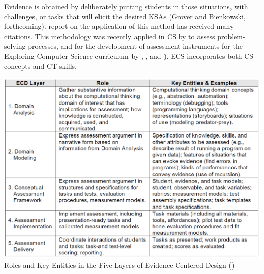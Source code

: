 Evidence is obtained by deliberately putting students in those situations, with challenges, or tasks that will elicit the desired KSAs (Grover and Bienkowski, forthcoming).  report on the application of this method has received many citations. This methodology was recently applied in CS by  to assess problem-solving processes, and for the development of assessment instruments for the Exploring Computer Science curriculum by , , and ). ECS incorporates both CS concepts and CT skills.




\begin{table}
\includegraphics[scale=0.8]{figures/ECDoverview.png}
Roles and Key Entities in the Five Layers of Evidence-Centered Design (\cite{2014SnowBienkowski})
\end{table}




